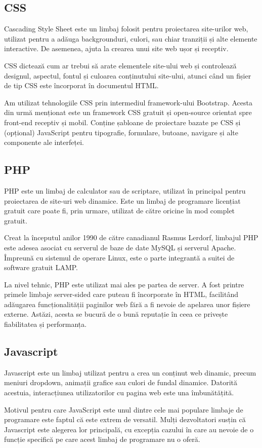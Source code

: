 \documentclass[12pt,a4paper]{report}
\begin{document}
\subsection{CSS}
\par
Cascading Style Sheet este un limbaj folosit pentru proiectarea site-urilor web, utilizat pentru a adăuga backgrounduri, culori, sau chiar tranziții și alte elemente interactive. De asemenea, ajuta la crearea unui site web ușor și receptiv.
\\\par 
CSS dictează cum ar trebui să arate elementele site-ului web și controlează designul, aspectul, fontul și culoarea conținutului site-ului, atunci când un fișier de tip CSS este încorporat în documentul HTML.
\\\par 
Am utilizat tehnologiile CSS prin intermediul framework-ului Bootstrap. Acesta din urmă menționat este un framework CSS gratuit și open-source orientat spre front-end receptiv și mobil. Conține șabloane de proiectare bazate pe CSS și (opțional) JavaScript pentru tipografie, formulare, butoane, navigare și alte componente ale interfeței.
\subsection{PHP}
\par
PHP este un limbaj de calculator sau de scriptare, utilizat în principal pentru proiectarea de site-uri web dinamice. Este un limbaj de programare licențiat gratuit care poate fi, prin urmare, utilizat de către oricine în mod complet gratuit.
\\\par 
Creat la începutul anilor 1990 de către canadianul Rasmus Lerdorf, limbajul PHP este adesea asociat cu serverul de baze de date MySQL și serverul Apache. Împreună cu sistemul de operare Linux, este o parte integrantă a suitei de software gratuit LAMP.
\\\par 
La nivel tehnic, PHP este utilizat mai ales pe partea de server. A fost printre primele limbaje server-sided care puteau fi încorporate în HTML, facilitând adăugarea funcționalității paginilor web fără a fi nevoie de apelarea unor fișiere externe. Astăzi, acesta se bucură de o bună reputație în ceea ce privește fiabilitatea și performanța.
\subsection{Javascript}
\par
Javascript este un limbaj utilizat pentru a crea un conținut web dinamic, precum meniuri dropdown, animații grafice sau culori de fundal dinamice. Datorită acestuia, interacțiunea utilizatorilor cu pagina web este una îmbunătățită. 
\\\par 
Motivul pentru care JavaScript este unul dintre cele mai populare limbaje de programare este faptul că este extrem de versatil. Mulți dezvoltatori susțin că Javascript este alegerea lor principală, cu excepția cazului în care au nevoie de o funcție specifică pe care acest limbaj de programare nu o oferă.
\end{document}
